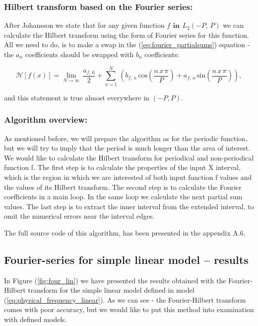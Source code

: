 \documentclass[12pt,twoside,a4paper]{article}
\numberwithin{equation}{subsection}
\numberwithin{figure}{subsection}
\begin{document}
\subsubsection*{Hilbert transform based on the Fourier series:}

After Johansson \cite{johansson_hilbert} we state that for any given function $f\,\ \textbf{in}\ \,{L_{2}}( - P, \,P)$ we can calculate the Hilbert transform using the form of Fourier series for this function. All we need to do, is to make a swap in the (\ref{eq:fourier_partialsums}) equation - the ${a_{n}}$ coefficients should be swapped with ${b_{n}}$ coefficients:

\begin{equation} \label{eq:fourier_hilbert}
	\mathcal{H}[f(x)] = \lim_{N\rightarrow \infty } \, \frac {{a_{f, \, 0}}}{2}  + \sum_{ n=1}^{N} \, 
		\left(
	  		  {b_{f, \,n}} \, \mathrm{cos}(\frac{n \, x\, \pi}{P}) 
			+ {a_{f, \,n}} \, \mathrm{sin}(\frac{n \, x\, \pi}{P})
		\right),
\end{equation}

and this statement is true almost everywhere in $(-P, P)$.

\subsubsection*{Algorithm overview:}

As mentioned before, we will prepare the algorithm as for the periodic function, but we will try to imply that the period is much longer than the area of interest. We would like to calculate the Hilbert transform for periodical and non-periodical function f. The first step is to calculate the properties of the input X interval, which is the region in which we are interested of both input function f values and the values of its Hilbert transform. The second step is to calculate the Fourier coefficients in a main loop. In the same loop we calculate the next partial sum values. The last step is to extract the inner interval from the extended interval, to omit the numerical errors near the interval edges.

The full source code of this algorithm, has been presented in the appendix A.6.

\subsection{Fourier-series for simple linear model -- results} \label{chap:fourier_lin}

In Figure (\ref{fig:four_lin}) we have presented the results obtained with the Fourier-Hilbert transform for the simple linear model defined in model (\ref{eq:physical_frequency_linear}). As we can see - the Fourier-Hilbert transform comes with poor accuracy, but we would like to put this method into examination with defined models.
\end{document}
